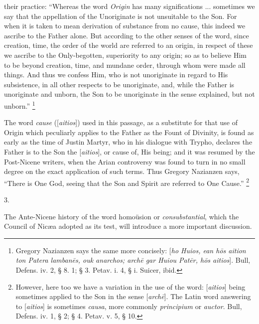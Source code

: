 their practice: ``Whereas the word \emph{Origin} has many
significations ... sometimes we say that the appellation of the
Unoriginate is not unsuitable to the Son. For when it is taken to mean
derivation of substance from no cause, this indeed we ascribe to the
Father alone. But according to the other senses of the word, since
creation, time, the order of the world are referred to an origin, in
respect of these we ascribe to the Only-begotten, superiority to any
origin; so as to believe Him to be beyond creation, time, and mundane
order, through whom were made all things. And thus we confess Him, who
is not unoriginate in regard to His subsistence, in all other respects
to be unoriginate, and, while the Father is unoriginate and unborn,
the Son to be unoriginate in the sense explained, but not
unborn.'' \footnote{Gregory Nazianzen says the same more
concisely: [\emph{ho Huios, ean h\={o}s aition ton Patera lamban\={e}s,
ouk anarchos; arch\={e} gar Huiou Pat\={e}r, h\={o}s aitios}].
Bull, Defens. iv. 2, § 8. 1; § 3. Petav. i. 4, § i. Suicer, ibid.}

The word \emph{cause} ([\emph{aitios}]) used in this passage, as a
substitute for that use of Origin which peculiarly applies to the
Father as the Fount of Divinity, is found as early as the time of
Justin Martyr, who in his dialogue with Trypho, declares the Father is
to the Son the [\emph{aitios}], or cause of, His being; and it was
resumed by the Post-Nicene writers, when the Arian controversy was
found to turn in no small degree on the exact application of such
terms. Thus Gregory Nazianzen says, ``There is One God, seeing
that the Son and Spirit are referred to One Cause.'' \footnote{However, here too we have a variation in the
use of the word: [\emph{aitios}] being sometimes applied to the Son in
the sense [\emph{arch\={e}}]. The Latin word answering to [\emph{aitios}]
is sometimes \emph{causa}, more commonly \emph{principium} or \emph{auctor}.
Bull, Defens. iv. 1, § 2; § 4. Petav. v. 5, § 10.}

3.

The Ante-Nicene history of the word homoüsion or \emph{consubstantial},
which the Council of Nicæa adopted as its test, will introduce a more
important discussion.

